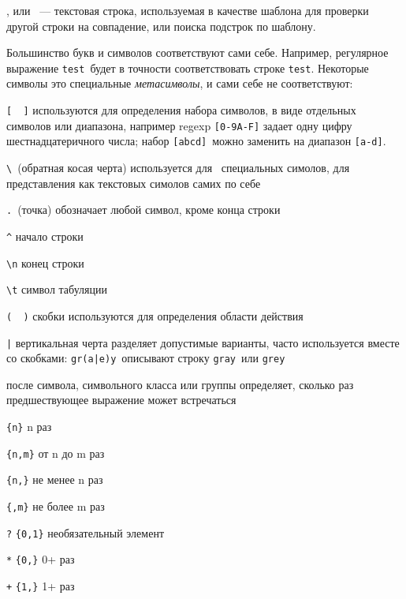 \label{regexp}

 \cite{wikiregexp}, или 
\ --- текстовая строка, используемая в качестве
шаблона для проверки другой строки на совпадение, или поиска подстрок по
шаблону.

Большинство букв и символов соответствуют сами себе. Например, регулярное 
выражение \verb|test|\ будет в точности соответствовать строке \verb|test|.
Некоторые символы это специальные \emph{метасимволы}, и сами себе не 
соответствуют:

\begin{description}

\item{\verb|[  ]|} используются для определения набора символов, в виде
отдельных символов или диапазона, например regexp \verb|[0-9A-F]| задает одну
цифру шестнадцатеричного числа; набор \verb|[abcd]|\ можно заменить на диапазон
\verb|[a-d]|. 

\item{\verb|\|\ (обратная косая черта)} используется для \
специальных симолов, для представления как текстовых симолов самих по себе

\item{\verb|.|\ (точка)} обозначает любой символ, кроме конца строки

\item{\verb|^|} начало строки

\item{\verb|\n|} конец строки

\item{\verb|\t|} символ табуляции

\item{\verb|(  )|} скобки используются для определения области действия

\item{\verb$|$} вертикальная черта разделяет допустимые варианты,
часто используется вместе со скобками: \verb$gr(a|e)y$\ описывают строку 
\verb|gray|\ или \verb|grey|

\item{} после символа, 
символьного класса или группы 
определяет, сколько раз предшествующее выражение может встречаться

\item{\verb|{n}|} n раз
\item{\verb|{n,m}|} от n до m раз
\item{\verb|{n,}|} не менее n раз
\item{\verb|{,m}|} не более m раз

\item{\verb|?|} \verb|{0,1}| необязательный элемент
\item{\verb|*|} \verb|{0,}| 0+ раз
\item{\verb|+|} \verb|{1,}| 1+ раз

\end{description}

